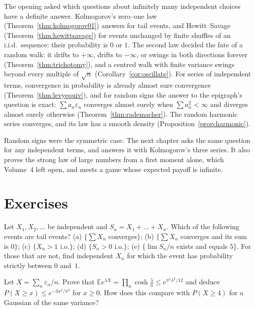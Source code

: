 The opening asked which questions about infinitely many independent choices have a definite answer. Kolmogorov's zero--one law
(Theorem~\ref{thm:kolmogorov01}) answers for tail events, and Hewitt--Savage (Theorem~\ref{thm:hewittsavage}) for events unchanged by
finite shuffles of an i.i.d.\ sequence: their probability is $0$ or $1$. The second law decided the fate of a random walk: it drifts to
$+\infty$, drifts to $-\infty$, or swings in both directions forever (Theorem~\ref{thm:trichotomy}), and a centred walk with finite variance
swings beyond every multiple of $\sqrt n$ (Corollary~\ref{cor:oscillate}). For series of independent terms, convergence in probability is
already almost sure convergence (Theorem~\ref{thm:levyequiv}), and for random signs the answer to the epigraph's question is exact:
$\sum a_n\varepsilon_n$ converges almost surely when $\sum a_n^2<\infty$ and diverges almost surely otherwise (Theorem~\ref{thm:rademacher}).
The random harmonic series converges, and its law has a smooth density (Proposition~\ref{prop:harmonic}).

Random signs were the symmetric case. The next chapter asks the same question for any independent terms, and answers it with Kolmogorov's
three series. It also proves the strong law of large numbers from a first moment alone, which Volume~4 left open, and meets a game whose
expected payoff is infinite.

\section{Exercises}

\begin{exercise}[$\star$]\label{ex:tailevents}
Let $X_1,X_2,\dots$ be independent and $S_n=X_1+\dots+X_n$. Which of the following events are tail events? (a) $\{\sum X_n$ converges$\}$;
(b) $\{\sum X_n$ converges and its sum is $0\}$; (c) $\{X_n>1$ i.o.$\}$; (d) $\{S_n>0$ i.o.$\}$; (e) $\{\lim S_n/n$ exists and equals $5\}$.
For those that are not, find independent $X_n$ for which the event has probability strictly between $0$ and~$1$.
\end{exercise}

\begin{exercise}[$\star$]\label{ex:subgauss}
Let $X=\sum_n\varepsilon_n/n$. Prove that $\mathbb E e^{\lambda X}=\prod_n\cosh\frac\lambda n\le e^{\pi^2\lambda^2/12}$ and deduce
$P(X\ge x)\le e^{-3x^2/\pi^2}$ for $x\ge0$. How does this compare with $P(X\ge4)$ for a Gaussian of the same variance?
\end{exercise}

